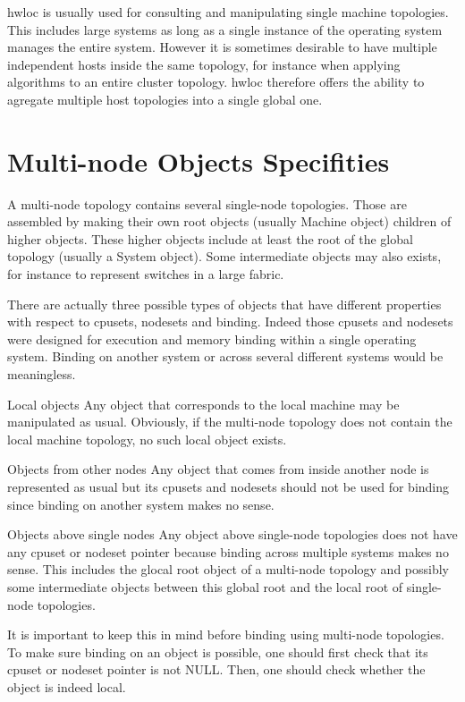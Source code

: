 hwloc is usually used for consulting and manipulating single machine topologies. This includes large systems as long as a single instance of the operating system manages the entire system. However it is sometimes desirable to have multiple independent hosts inside the same topology, for instance when applying algorithms to an entire cluster topology. hwloc therefore offers the ability to agregate multiple host topologies into a single global one.\hypertarget{a00006_multinode_cpusets}{}\section{Multi-\/node Objects Specifities}\label{a00006_multinode_cpusets}
A multi-\/node topology contains several single-\/node topologies. Those are assembled by making their own root objects (usually Machine object) children of higher objects. These higher objects include at least the root of the global topology (usually a System object). Some intermediate objects may also exists, for instance to represent switches in a large fabric.

There are actually three possible types of objects that have different properties with respect to cpusets, nodesets and binding. Indeed those cpusets and nodesets were designed for execution and memory binding within a single operating system. Binding on another system or across several different systems would be meaningless.


\begin{DoxyDescription}
\item[Local objects ]Any object that corresponds to the local machine may be manipulated as usual. Obviously, if the multi-\/node topology does not contain the local machine topology, no such local object exists.  
\item[Objects from other nodes ]Any object that comes from inside another node is represented as usual but its cpusets and nodesets should not be used for binding since binding on another system makes no sense.  
\item[Objects above single nodes ]Any object above single-\/node topologies does not have any cpuset or nodeset pointer because binding across multiple systems makes no sense. This includes the glocal root object of a multi-\/node topology and possibly some intermediate objects between this global root and the local root of single-\/node topologies.  
\end{DoxyDescription}

It is important to keep this in mind before binding using multi-\/node topologies. To make sure binding on an object is possible, one should first check that its cpuset or nodeset pointer is not NULL. Then, one should check whether the object is indeed local.

